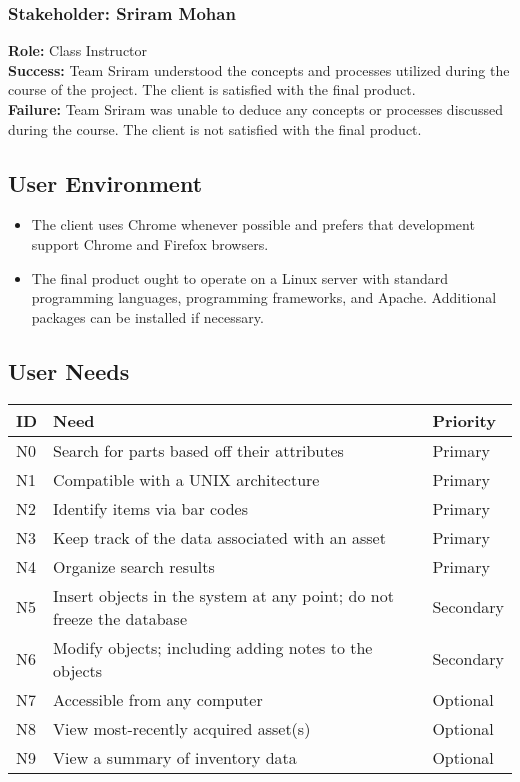 \documentclass{article}
\begin{document}
\subsubsection{Stakeholder: Sriram Mohan}
\textbf{Role:} Class Instructor\\
\textbf{Success:} Team Sriram understood the concepts and processes utilized during the course of the project. The client is satisfied with the final product.\\
\textbf{Failure:} Team Sriram was unable to deduce any concepts or processes discussed during the course. The client is not satisfied with the final product.

\subsection{User Environment}
\begin{itemize}
\item The client uses Chrome whenever possible and prefers that development support Chrome and Firefox browsers.
\item The final product ought to operate on a Linux server with standard programming languages, programming frameworks, and Apache.  Additional packages can be installed if necessary.
\end{itemize}

\subsection{User Needs}
\begin{tabular}{ | p{0.15in} | p{4.0in} | p{.75in} |}
\hline
\textbf{ID} & \textbf{Need} & \textbf{Priority} \\
\hline
\hline
N0 & Search for parts based off their attributes & Primary \\
\hline
N1 & Compatible with a UNIX architecture & Primary \\
\hline
N2 & Identify items via bar codes & Primary \\
\hline
N3 & Keep track of the data associated with an asset & Primary \\
\hline
N4 & Organize search results & Primary \\
\hline
N5 & Insert objects in the system at any point; do not freeze the database & Secondary \\
\hline
N6 & Modify objects; including adding notes to the objects & Secondary \\
\hline
N7 & Accessible from any computer & Optional \\
\hline
N8 & View most-recently acquired asset(s) & Optional \\
\hline
N9 & View a summary of inventory data & Optional \\
\hline
\end{tabular}
\end{document}
